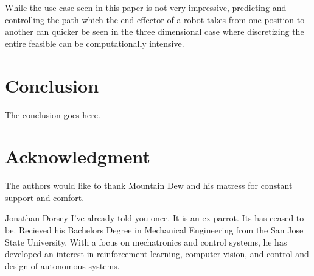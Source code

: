 \documentclass[journal]{IEEEtran}
\begin{document}
While the use case seen in this paper is not very impressive, predicting and controlling the path which the end effector of a robot takes from one position to another can quicker be seen in the three dimensional case where discretizing the entire feasible can be computationally intensive.\\





\section{Conclusion}
The conclusion goes here.


\section*{Acknowledgment}


The authors would like to thank Mountain Dew and his matress for constant support and comfort.



\ifCLASSOPTIONcaptionsoff
  \newpage
\fi

\cite{craig_introduction_2005}
\cite{khalil_nonlinear_2002}
\cite{rawlings_model_2017}
\cite{armstrong_explicit_1986}
\cite{ogata_modern_2010}
\cite{meriam_engineering_1993}
\cite{greenwood_advanced_2006}
\cite{borrelli_predictive_2017}
\cite{boyd_convex_2004}
\cite{slotine_applied_1991}


\begin{IEEEbiography}{Jonathan Dorsey}
  I've already told you once. It is an ex parrot. Its has ceased to be. Recieved his Bachelors Degree in Mechanical Engineering from the San Jose State University. With a focus on mechatronics and control systems, he has developed an interest in reinforcement learning, computer vision, and control and design of autonomous systems.
\end{IEEEbiography}
\end{document}
